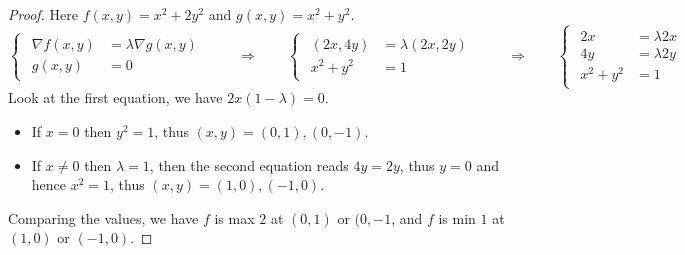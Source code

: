 \begin{proof} Here $f(x,y) = x^2+2y^2$ and $g(x,y) = x^2+y^2$. 
\begin{equation*}
    \begin{cases}
        \begin{aligned}
            \nabla f(x,y) &= \lambda \nabla g(x,y)\\
            g(x,y) &= 0
        \end{aligned}
    \end{cases} \qquad\Longrightarrow\qquad 
    \begin{cases}
        \begin{aligned}
            (2x, 4y) &= \lambda(2x,2y)\\
            x^2+y^2&=1
        \end{aligned}
    \end{cases} \qquad\Longrightarrow\qquad \begin{cases}
    \begin{aligned}
        2x&=\lambda 2x\\
        4y&=\lambda 2y\\
        x^2+y^2&=1
        \end{aligned}
    \end{cases}
\end{equation*}
Look at the first equation, we have $2x(1-\lambda) = 0$. 
\begin{itemize}
    \item If $x=0$ then $y^2=1$, thus $(x,y) = (0,1), (0,-1)$.
    \item If $x\neq 0$ then $\lambda = 1$, then the second equation reads $4y = 2y$, thus $y=0$ and hence $x^2=1$, thus $(x,y)=(1,0), (-1,0)$.
\end{itemize}
Comparing the values, we have $f$ is max $2$ at $(0,1)$ or $(0,-1$, and $f$ is min $1$ at $(1,0)$ or $(-1,0)$.
\end{proof}

